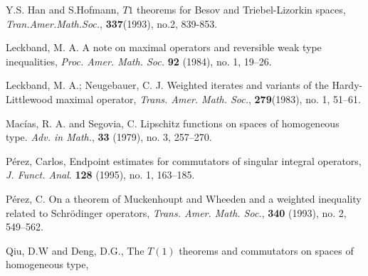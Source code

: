 \documentclass[12pt]{article}
\begin{document}
\begin{thebibliography}{99}
%
Y.S. Han and S.Hofmann, $T1$ theorems for Besov and Triebel-Lizorkin spaces,
{\em Tran.Amer.Math.Soc.}, {\bf 337}(1993), no.2, 839-853.

Leckband, M. A. A note on maximal operators and reversible weak type
inequalities, {\em Proc. Amer. Math. Soc.} {\bf 92} (1984), no. 1, 19--26.

Leckband, M. A.; Neugebauer, C. J. Weighted iterates and variants of
the Hardy-Littlewood maximal operator,
{\em Trans. Amer. Math. Soc.}, {\bf 279}(1983), no. 1, 51--61.

Mac\'ias, R. A. and Segovia, C.  Lipschitz functions on spaces of
homogeneous type. {\em Adv. in Math.}, {\bf 33} (1979), no. 3, 257--270.

P\'erez, Carlos, Endpoint estimates for commutators of singular integral
operators, {\em J. Funct. Anal}. {\bf 128} (1995), no. 1, 163--185. 


P\'erez, C. On a theorem of Muckenhoupt and Wheeden and a weighted
inequality related to Schr\"odinger operators, {\em
Trans. Amer. Math. Soc.}, {\bf 340} (1993), no. 2, 549--562.

Qiu, D.W and Deng, D.G., The $T(1)$ theorems and commutators on spaces
of homogeneous type, 


\end{thebibliography}
\end{document}
